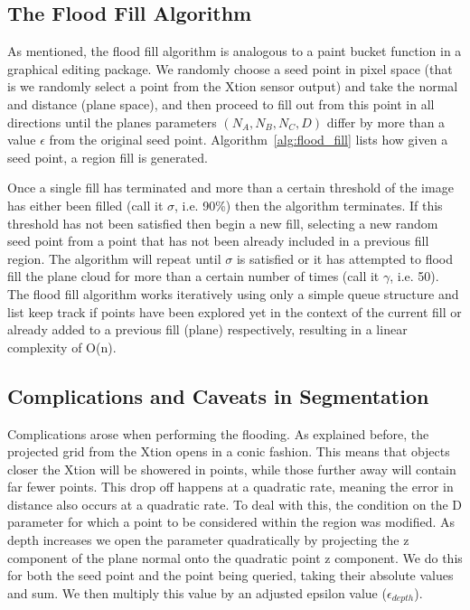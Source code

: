 \documentclass[]{article}
\begin{document}
{\subsection{The Flood Fill Algorithm}
\label{sub:flood_fill_algo}
As mentioned, the flood fill algorithm is analogous to a paint bucket function in a graphical editing package. We randomly choose a seed point in pixel space (that is we randomly select a point from the Xtion sensor output) and take the normal and distance (plane space), and then proceed to fill out from this point in all directions until the planes parameters $(N_A, N_B, N_C, D)$ differ by more than a value $\epsilon$ from the original seed point. Algorithm~\ref{alg:flood_fill} lists how given a seed point, a region fill is generated.

Once a single fill has terminated and more than a certain threshold of the image has either been filled (call it $\sigma$, i.e. 90\%) then the algorithm terminates. If this threshold has not been satisfied then begin a new fill, selecting a new random seed point from a point that has not been already included in a previous fill region. The algorithm will repeat until $\sigma$ is satisfied or it has attempted to flood fill the plane cloud for more than a certain number of times (call it $\gamma$, i.e. 50). The flood fill algorithm works iteratively using only a simple queue structure and list keep track if points have been explored yet in the context of the current fill or already added to a previous fill (plane) respectively, resulting in a linear complexity of O(n). 


\subsection{Complications and Caveats in Segmentation} %
\label{sub:complications_in_the_segmentation_algorithm}


Complications arose when performing the flooding. As explained before, the projected grid from the Xtion opens in a conic fashion. This means that objects closer the Xtion will be showered in points, while those further away will contain far fewer points. This drop off happens at a quadratic rate, meaning the error in distance also occurs at a quadratic rate. To deal with this, the condition on the D parameter for which a point to be considered within the region was modified. As depth increases we open the parameter quadratically by projecting the z component of the plane normal onto the quadratic point z component. We do this for both the seed point and the point being queried, taking their absolute values and sum. We then multiply this value by an adjusted epsilon value ($\epsilon_{depth}$). 


}
\end{document}

